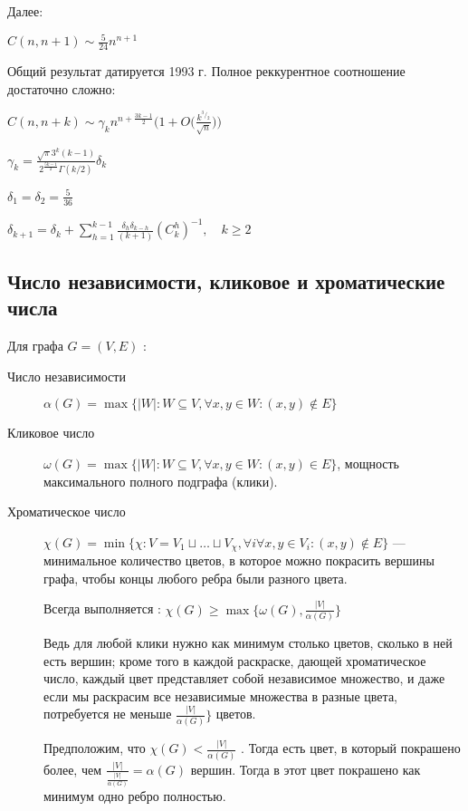Далее:

$\displaystyle C(n,n+1) \sim \frac 5 {24} n ^{n+1}$


Общий результат датируется 1993 г.  Полное реккурентное соотношение достаточно сложно:

$
C(n,n+k) \sim \gamma _k n^{n+ \frac {3k-1} 2} \bigg(1 + O\bigg(\frac {k^{^3/_2}} {\sqrt n} \bigg )\bigg)
$

$
\gamma_k = \frac {\sqrt \pi 3^k (k-1)}{2^ {\frac {5k-1} 2} \Gamma(k/2)} \delta_k
$

$
\delta_1 = \delta_2 = \frac 5 {36} 
$

$\delta_{k+1} = \delta_k + \sum \limits _{h=1} ^{k-1} \frac {\delta_h \delta_{k-h}} {(k+1)} ( C^h _k)^{-1}, \quad k \geq 2$
\subsection{Число независимости, кликовое и хроматические числа}

Для графа $ G = (V, E) $  :

\begin{description}
\item[Число независимости] $\alpha(G) = \max \{|W| : W \subseteq V, \forall x, y \in W : (x,y) \notin E\}$

\item[Кликовое число] $\omega(G) = \max \{|W| : W \subseteq V, \forall x, y \in W : (x,y) \in E\}$, мощность максимального полного подграфа (клики). 

\item[Хроматическое число] $\chi(G) = \min \{\chi : V = V_1  \sqcup \dots \sqcup V_{\chi}, \forall i \forall x,y \in V_i: (x,y) \notin E  \}$ --- минимальное количество цветов, в которое можно покрасить вершины графа, чтобы концы любого ребра были разного цвета.

Всегда выполняется :
 $\chi(G) \geq \max \{ \omega(G), \frac {|V|} {\alpha(G)} \} $
 
Ведь для любой клики нужно как минимум столько цветов, сколько в ней есть вершин; кроме того в каждой раскраске, дающей хроматическое число, каждый цвет представляет собой независимое множество, и даже если мы раскрасим все независимые множества в разные цвета, потребуется не меньше $  \frac {|V|} {\alpha(G)} \} $ цветов. 
 

Предположим, что $\chi(G) < \frac {|V|} {\alpha(G)}$ . Тогда есть цвет, в который покрашено более, чем $ \frac {|V|} { \frac {|V|} {\alpha(G)}} = \alpha(G) $ вершин. Тогда в этот цвет покрашено как минимум одно ребро полностью. 
\end{description}

